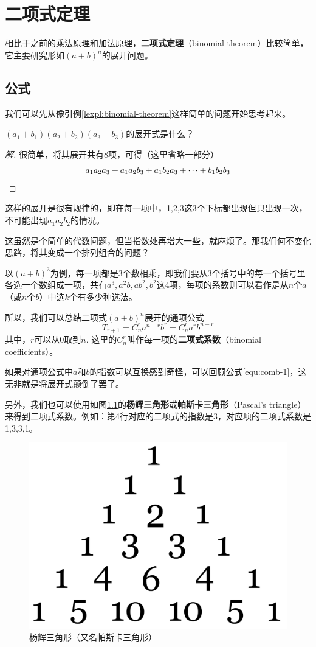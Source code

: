 \chapter{二项式定理}
相比于之前的乘法原理和加法原理，\textbf{二项式定理}（binomial theorem）比较简单，它主要研究形如$(a+b)^n$的展开问题。

\section{公式}
我们可以先从像引例\ref{lexpl:binomial-theorem}这样简单的问题开始思考起来。

\begin{lexample}\label{lexpl:binomial-theorem}
	$(a_1+b_1)(a_2+b_2)(a_3+b_3)$的展开式是什么？
\end{lexample}

\begin{proof}[解]
	很简单，将其展开共有8项，可得（这里省略一部分）\[a_1a_2a_3+a_1a_2b_3+a_1b_2a_3+\cdots+b_1b_2b_3\qedhere\]
\end{proof}

这样的展开是很有规律的，即在每一项中，1,2,3这3个下标都出现但只出现一次，不可能出现$a_1a_2b_2$的情况。

这虽然是个简单的代数问题，但当指数处再增大一些，就麻烦了。那我们何不变化思路，将其变成一个排列组合的问题？

以$(a+b)^3$为例，每一项都是3个数相乘，即我们要从3个括号中的每一个括号里各选一个数组成一项，共有$a^3,a^2b,ab^2,b^2$这4项，每项的系数则可以看作是从$n$个$a$（或$n$个$b$）中选$k$个有多少种选法。

所以，我们可以总结二项式$(a+b)^n$展开的通项公式\[T_{r+1}=C_n^ra^{n-r}b^r=C_n^ra^rb^{n-r}\]其中，$r$可以从0取到$n$. 这里的$C_n^r$叫作每一项的\textbf{二项式系数}（binomial coefficients）。

如果对通项公式中$a$和$b$的指数可以互换感到奇怪，可以回顾公式\eqref{equ:comb-1}，这无非就是将展开式颠倒了罢了。

另外，我们也可以使用如图\ref{fig:pascals-triangle}的\textbf{杨辉三角形}或\textbf{帕斯卡三角形}（Pascal's triangle）来得到二项式系数。例如：第4行对应的二项式的指数是3，对应项的二项式系数是1,3,3,1。

\begin{figure}[htb]
	\centering
	\includegraphics[width=0.4\linewidth]{src/images/pascals-triangle.png}
	\caption{杨辉三角形（又名帕斯卡三角形）}
	\label{fig:pascals-triangle}
\end{figure}

